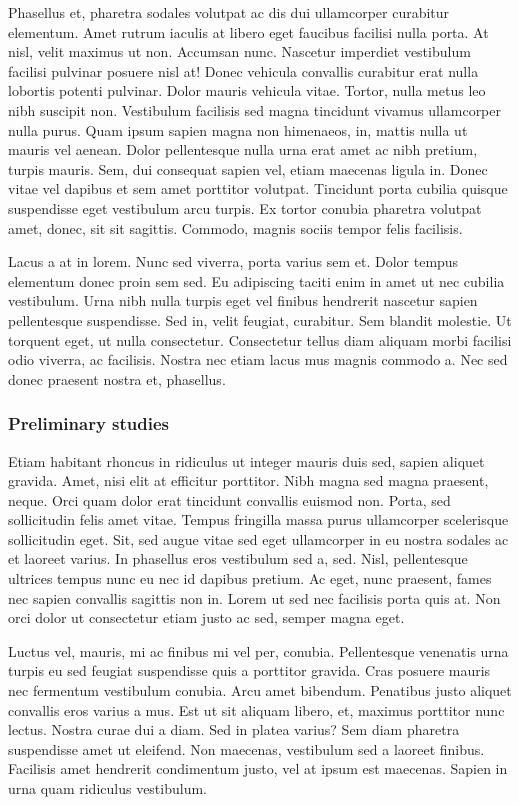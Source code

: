 \documentclass[11pt,]{article}
\begin{document}
Phasellus et, pharetra sodales volutpat ac dis dui ullamcorper curabitur
elementum. Amet rutrum iaculis at libero eget faucibus facilisi nulla
porta. At nisl, velit maximus ut non. Accumsan nunc. Nascetur imperdiet
vestibulum facilisi pulvinar posuere nisl at! Donec vehicula convallis
curabitur erat nulla lobortis potenti pulvinar. Dolor mauris vehicula
vitae. Tortor, nulla metus leo nibh suscipit non. Vestibulum facilisis
sed magna tincidunt vivamus ullamcorper nulla purus. Quam ipsum sapien
magna non himenaeos, in, mattis nulla ut mauris vel aenean. Dolor
pellentesque nulla urna erat amet ac nibh pretium, turpis mauris. Sem,
dui consequat sapien vel, etiam maecenas ligula in. Donec vitae vel
dapibus et sem amet porttitor volutpat. Tincidunt porta cubilia quisque
suspendisse eget vestibulum arcu turpis. Ex tortor conubia pharetra
volutpat amet, donec, sit sit sagittis. Commodo, magnis sociis tempor
felis facilisis.

Lacus a at in lorem. Nunc sed viverra, porta varius sem et. Dolor tempus
elementum donec proin sem sed. Eu adipiscing taciti enim in amet ut nec
cubilia vestibulum. Urna nibh nulla turpis eget vel finibus hendrerit
nascetur sapien pellentesque suspendisse. Sed in, velit feugiat,
curabitur. Sem blandit molestie. Ut torquent eget, ut nulla consectetur.
Consectetur tellus diam aliquam morbi facilisi odio viverra, ac
facilisis. Nostra nec etiam lacus mus magnis commodo a. Nec sed donec
praesent nostra et, phasellus.

\hypertarget{preliminary-studies}{%
\subsubsection{Preliminary studies}\label{preliminary-studies}}

Etiam habitant rhoncus in ridiculus ut integer mauris duis sed, sapien
aliquet gravida. Amet, nisi elit at efficitur porttitor. Nibh magna sed
magna praesent, neque. Orci quam dolor erat tincidunt convallis euismod
non. Porta, sed sollicitudin felis amet vitae. Tempus fringilla massa
purus ullamcorper scelerisque sollicitudin eget. Sit, sed augue vitae
sed eget ullamcorper in eu nostra sodales ac et laoreet varius. In
phasellus eros vestibulum sed a, sed. Nisl, pellentesque ultrices tempus
nunc eu nec id dapibus pretium. Ac eget, nunc praesent, fames nec sapien
convallis sagittis non in. Lorem ut sed nec facilisis porta quis at. Non
orci dolor ut consectetur etiam justo ac sed, semper magna eget.

Luctus vel, mauris, mi ac finibus mi vel per, conubia. Pellentesque
venenatis urna turpis eu sed feugiat suspendisse quis a porttitor
gravida. Cras posuere mauris nec fermentum vestibulum conubia. Arcu amet
bibendum. Penatibus justo aliquet convallis eros varius a mus. Est ut
sit aliquam libero, et, maximus porttitor nunc lectus. Nostra curae dui
a diam. Sed in platea varius? Sem diam pharetra suspendisse amet ut
eleifend. Non maecenas, vestibulum sed a laoreet finibus. Facilisis amet
hendrerit condimentum justo, vel at ipsum est maecenas. Sapien in urna
quam ridiculus vestibulum.
\end{document}
